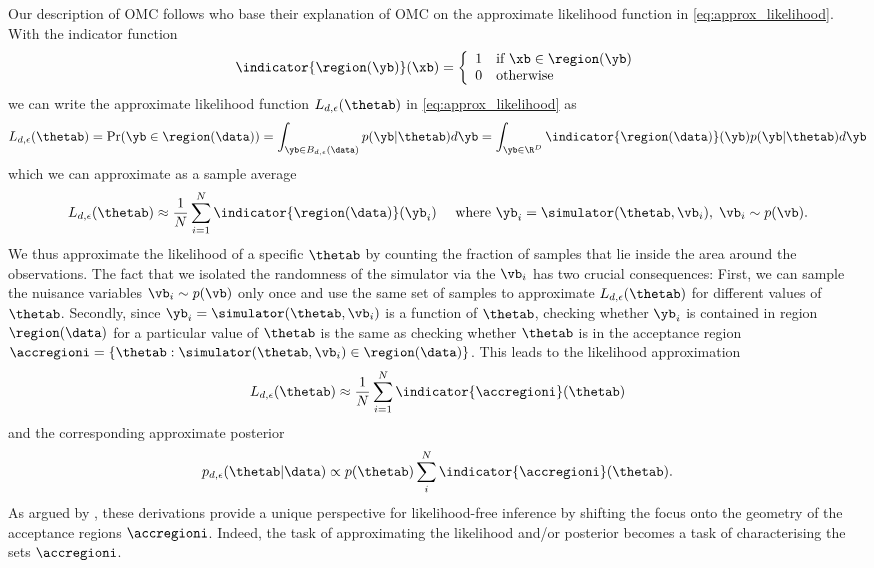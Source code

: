 Our description of OMC \citep{Meeds2015}
follows \citet{Ikonomov2019} who base their explanation of OMC on the
approximate likelihood function in \eqref{eq:approx_likelihood}. With
the indicator function
%
\begin{equation} \label{eq:indicator} \indicator{\region(\yb)}(\xb)=
  \left\{
    \begin{array}{ll}
      1 & \mbox{if } \xb \in \region(\yb) \\
      0 & \mbox{otherwise} 
    \end{array} \right. \end{equation}
%
we can write the approximate likelihood function $L_{d, \epsilon}(\thetab)$ in \eqref{eq:approx_likelihood} as
\begin{gather} \label{eq:approx_likelihood_omc}
  L_{d, \epsilon}(\thetab) = \Pr(\yb \in \region(\data)) =
  \int_{\yb \in B_{d,\epsilon}(\data)}p(\yb|\thetab)d\yb =
  \int_{\yb \in \R^D} \indicator{\region(\data)}(\yb)p(\yb|\thetab)d\yb
\end{gather}
which we can approximate as a sample average
\begin{equation}
L_{d, \epsilon}(\thetab) \approx \frac{1}{N} \sum_{i=1}^N \indicator{\region (\data)} (\yb_i)
 \quad \text{ where } \yb_i = \simulator(\thetab, \vb_i),\; \vb_i \sim p(\vb). \label{eq:alt_view}
\end{equation}
We thus approximate the likelihood of a specific $\thetab$ by counting
the fraction of samples that lie inside the area around the
observations. The fact that we isolated the randomness of the
simulator via the $\vb_i$ has two crucial consequences: First, we can
sample the nuisance variables $\vb_i \sim p(\vb)$ only once and use
the same set of samples to approximate $L_{d,\epsilon}(\thetab)$ for
different values of $\thetab$. Secondly, since
$\yb_i=\simulator(\thetab, \vb_i)$ is a function of $\thetab$,
checking whether $\yb_i$ is contained in region $\region (\data)$ for
a particular value of $\thetab$ is the same as checking whether
$\thetab$ is in the acceptance region $\accregioni
= \{ \thetab: \simulator(\thetab, \vb_i) \in \region(\data) \}$. This
leads to the likelihood approximation
\begin{equation}
L_{d, \epsilon}(\thetab) \approx \frac{1}{N} \sum_{i=1}^N \indicator{\accregioni}(\thetab) \label{eq:alt_view_theta}
\end{equation}
and the corresponding approximate posterior
\begin{equation} \label{eq:approx_posterior_omc}
  p_{d,\epsilon}(\thetab|\data) \propto
  p(\thetab) \sum_i^N  \indicator{\accregioni}(\thetab).
\end{equation}
As argued by \citet{Ikonomov2019}, these derivations provide a unique
perspective for likelihood-free inference by shifting the focus onto
the geometry of the acceptance regions $\accregioni$. Indeed, the task
of approximating the likelihood and/or posterior becomes a task of
characterising the sets $\accregioni$.

